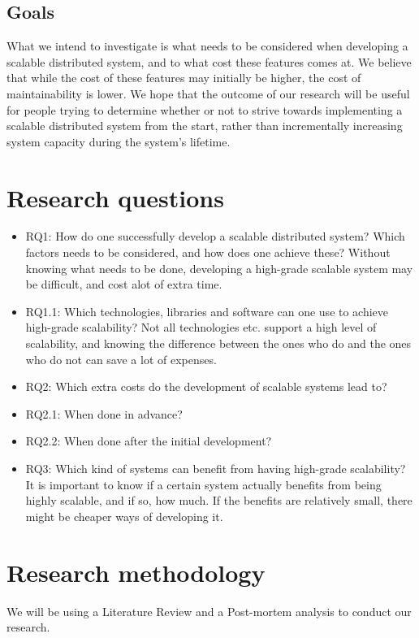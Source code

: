 \documentclass{article}
\begin{document}
\subsection{Goals} 
What we intend to investigate is what needs to be considered
when developing a scalable distributed system, and to what cost these features
comes at. We believe that while the cost of these features may initially be
higher, the cost of maintainability is lower. We hope that the outcome of our
research will be useful for people trying to determine whether or not to strive
towards implementing a scalable distributed system from the start, rather than
incrementally increasing system capacity during the system's lifetime.

\newpage

\section{Research questions}
\begin{itemize}
\item{RQ1: How do one successfully develop a scalable distributed system? Which
factors needs to be considered, and how does one achieve these? Without knowing
what needs to be done, developing a high-grade scalable system may be
difficult, and cost alot of extra time.} 

\item{RQ1.1: Which technologies, libraries and software can one use to achieve
high-grade scalability? Not all technologies etc. support a high level of
scalability, and knowing the difference between the ones who do and the ones
who do not can save a lot of expenses.}

\item{RQ2: Which extra costs do the development of scalable systems lead to?} 
\item{RQ2.1: When done in advance?} 
\item{RQ2.2: When done after the initial development?} 

\item{RQ3: Which kind of systems can benefit from having high-grade scalability?
It is important to know if a certain system actually benefits from being highly
scalable, and if so, how much. If the benefits are relatively small, there 
might be cheaper ways of developing it.}

\end{itemize}

\section{Research methodology}
We will be using a Literature Review and a Post-mortem analysis to conduct our 
research. 
\end{document}
